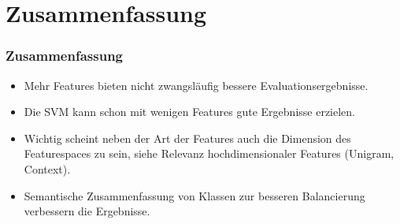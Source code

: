 \documentclass{beamer}
\begin{document}
\section{Zusammenfassung}
	\begin{frame}
		\frametitle{Zusammenfassung}
		\begin{itemize}
			\item Mehr Features bieten nicht zwangsläufig bessere Evaluationsergebnisse.
			\item Die SVM kann schon mit wenigen Features gute Ergebnisse erzielen.
			\item Wichtig scheint neben der Art der Features auch die Dimension des Featurespaces zu sein, siehe Relevanz hochdimensionaler Features (Unigram, Context).
			\item Semantische Zusammenfassung von Klassen zur besseren Balancierung verbessern die Ergebnisse.
		\end{itemize}
	\end{frame}
\end{document}

